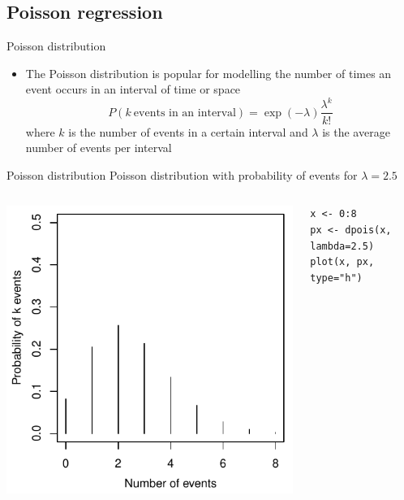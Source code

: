 \documentclass[aspectratio=169]{beamer}
\begin{document}
\subsection{Poisson regression}

\begin{frame}{Poisson distribution}
\begin{itemize}
  \item The Poisson distribution is popular for modelling the number of
    times an event occurs in an interval of time or space
\[
  P(k~\text{events in an interval}) = \exp(-\lambda)\frac{\lambda^k}{k!}
\]
where $k$ is the number of events in a certain interval and $\lambda$ is
the average number of events per interval
\end{itemize}
\end{frame}

\begin{frame}[fragile]{Poisson distribution}
  Poisson distribution with probability of events for $\lambda = 2.5$\\[2ex]

\begin{columns}[c]
\begin{column}{6cm}
  \includegraphics[scale=.7]{../figures/pois_dist}
\end{column}
\begin{column}{5cm}
  \begin{lstlisting}
x <- 0:8
px <- dpois(x, lambda=2.5)
plot(x, px, type="h")
\end{lstlisting}
\end{column}
\end{columns}
\end{frame}
\end{document}

